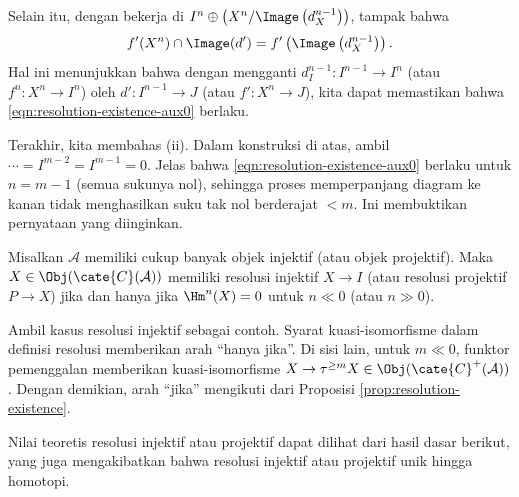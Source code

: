 \begin{bukti}
	Selain itu, dengan bekerja di $I^n \oplus \left( X^n / \Image\left( d_X^{n-1} \right) \right)$, tampak bahwa
	\[ f'(X^n) \cap \Image(d') = f'\left( \Image\left( d_X^{n-1} \right) \right). \]
	Hal ini menunjukkan bahwa dengan mengganti $d_I^{n-1}: I^{n-1} \to I^n$ (atau $f^n: X^n \to I^n$) oleh $d': I^{n-1} \to J$ (atau $f': X^n \to J$), kita dapat memastikan bahwa \eqref{eqn:resolution-existence-aux0} berlaku.
	
	Terakhir, kita membahas (ii). Dalam konstruksi di atas, ambil $\cdots = I^{m-2} = I^{m-1} = 0$. Jelas bahwa \eqref{eqn:resolution-existence-aux0} berlaku untuk $n = m-1$ (semua sukunya nol), sehingga proses memperpanjang diagram ke kanan tidak menghasilkan suku tak nol berderajat $< m$. Ini membuktikan pernyataan yang diinginkan.
\end{bukti}

\begin{korolari}
	Misalkan $\mathcal{A}$ memiliki cukup banyak objek injektif (atau objek projektif). Maka $X \in \Obj(\cate{C}(\mathcal{A}))$ memiliki resolusi injektif $X \to I$ (atau resolusi projektif $P \to X$) jika dan hanya jika $\Hm^n(X) = 0$ untuk $n \ll 0$ (atau $n \gg 0$).
\end{korolari}
\begin{bukti}
	Ambil kasus resolusi injektif sebagai contoh. Syarat kuasi-isomorfisme dalam definisi resolusi memberikan arah ``hanya jika''. Di sisi lain, untuk $m \ll 0$, funktor pemenggalan memberikan kuasi-isomorfisme $X \to \tau^{\geq m} X \in \Obj(\cate{C}^+(\mathcal{A}))$. Dengan demikian, arah ``jika'' mengikuti dari Proposisi \ref{prop:resolution-existence}.
\end{bukti}

Nilai teoretis resolusi injektif atau projektif dapat dilihat dari hasil dasar berikut, yang juga mengakibatkan bahwa resolusi injektif atau projektif unik hingga homotopi.

